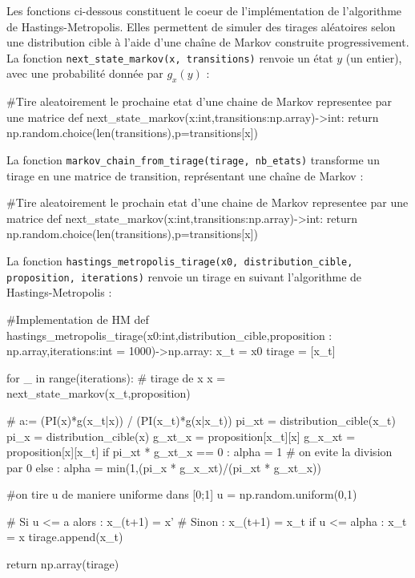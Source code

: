 \documentclass{article}
\begin{document}
Les fonctions ci-dessous constituent le coeur de l'implémentation de l'algorithme de Hastings-Metropolis. Elles permettent de simuler des tirages aléatoires selon une distribution cible à l'aide d'une chaîne de Markov construite progressivement. \\

La fonction \texttt{next\_state\_markov(x, transitions)} renvoie un état $y$ (un entier), avec une probabilité donnée par $g_x(y)$ :

\begin{python}
#Tire aleatoirement le prochaine etat d'une chaine de Markov representee par une matrice
def next_state_markov(x:int,transitions:np.array)->int:
        return np.random.choice(len(transitions),p=transitions[x])
\end{python}
\vspace{0.3cm}

La fonction \texttt{markov\_chain\_from\_tirage(tirage, nb\_etats)} transforme un tirage en une matrice de transition, représentant une chaîne de Markov :

\begin{python}
#Tire aleatoirement le prochain etat d'une chaine de Markov representee par une matrice
def next_state_markov(x:int,transitions:np.array)->int:
        return np.random.choice(len(transitions),p=transitions[x])
\end{python}
\vspace{0.3cm}

La fonction \texttt{hastings\_metropolis\_tirage(x0, distribution\_cible, proposition, iterations)} renvoie un tirage en suivant l'algorithme de Hastings-Metropolis :

\begin{python}
#Implementation de HM
def hastings_metropolis_tirage(x0:int,distribution_cible,proposition : np.array,iterations:int = 1000)->np.array:
    x_t = x0
    tirage = [x_t]

    for _ in range(iterations):
        # tirage de x
        x = next_state_markov(x_t,proposition)

        # a:= (PI(x)*g(x_t|x)) / (PI(x_t)*g(x|x_t))
        pi_xt = distribution_cible(x_t)
        pi_x = distribution_cible(x)
        g_xt_x = proposition[x_t][x]
        g_x_xt = proposition[x][x_t]
        if pi_xt * g_xt_x == 0 : alpha = 1 # on evite la division par 0
        else : alpha = min(1,(pi_x * g_x_xt)/(pi_xt * g_xt_x))

        #on tire u de maniere uniforme dans [0;1]
        u = np.random.uniform(0,1)

        # Si u <= a alors : x_(t+1) = x'
        # Sinon : x_(t+1) = x_t
        if u <= alpha : x_t = x
        tirage.append(x_t)

    return np.array(tirage)
\end{python}
\vspace{0.3cm}
\end{document}
